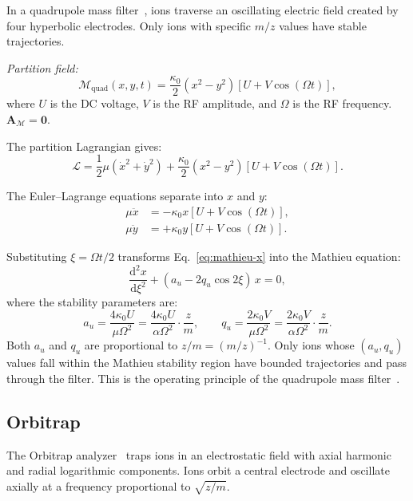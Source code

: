 \documentclass[11pt,twocolumn,a4paper]{article}
\theoremstyle{definition}
\theoremstyle{remark}
\newcommand{\Depth}{\mathcal{M}}
\newcommand{\partinert}{\mu}
\newcommand{\Apartition}{\mathbf{A}_{\mathcal{M}}}
\newcommand{\Lagr}{\mathcal{L}}
\begin{document}
In a quadrupole mass filter~\citep{paul1990}, ions traverse an oscillating electric field created by four hyperbolic electrodes. Only ions with specific $m/z$ values have stable trajectories.

\emph{Partition field:}
\[
  \Depth_{\mathrm{quad}}(x, y, t) = \frac{\kappa_0}{2}(x^2 - y^2)\left[U + V\cos(\Omega t)\right],
\]
where $U$ is the DC voltage, $V$ is the RF amplitude, and $\Omega$ is the RF frequency. $\Apartition = \mathbf{0}$.

The partition Lagrangian gives:
\[
  \Lagr = \frac{1}{2}\partinert(\dot{x}^2 + \dot{y}^2) + \frac{\kappa_0}{2}(x^2 - y^2)[U + V\cos(\Omega t)].
\]

The Euler--Lagrange equations separate into $x$ and $y$:
\begin{align}
  \partinert \ddot{x} &= -\kappa_0 x [U + V\cos(\Omega t)], \label{eq:mathieu-x} \\
  \partinert \ddot{y} &= +\kappa_0 y [U + V\cos(\Omega t)]. \label{eq:mathieu-y}
\end{align}

Substituting $\xi = \Omega t / 2$ transforms Eq.~\eqref{eq:mathieu-x} into the Mathieu equation:
\begin{equation}
\label{eq:mathieu}
  \frac{\mathrm{d}^2 x}{\mathrm{d}\xi^2} + (a_u - 2q_u \cos 2\xi)\, x = 0,
\end{equation}
where the stability parameters are:
\begin{equation}
\label{eq:mathieu-params}
  \boxed{a_u = \frac{4\kappa_0 U}{\partinert \Omega^2} = \frac{4\kappa_0 U}{\alpha \Omega^2} \cdot \frac{z}{m}, \qquad q_u = \frac{2\kappa_0 V}{\partinert \Omega^2} = \frac{2\kappa_0 V}{\alpha \Omega^2} \cdot \frac{z}{m}}.
\end{equation}
Both $a_u$ and $q_u$ are proportional to $z/m = (m/z)^{-1}$. Only ions whose $(a_u, q_u)$ values fall within the Mathieu stability region have bounded trajectories and pass through the filter. This is the operating principle of the quadrupole mass filter~\citep{paul1990, gross2017}.

\subsection{Orbitrap}
\label{sec:orbitrap}

The Orbitrap analyzer~\citep{makarov2000} traps ions in an electrostatic field with axial harmonic and radial logarithmic components. Ions orbit a central electrode and oscillate axially at a frequency proportional to $\sqrt{z/m}$.
\end{document}

